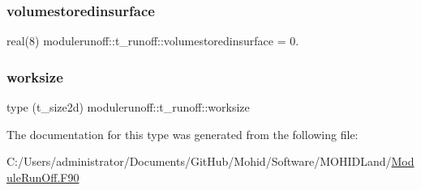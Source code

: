 \mbox{\label{structmodulerunoff_1_1t__runoff_adf99b757fd16db5037778285f91d6fb6}} 
\subsubsection{\texorpdfstring{volumestoredinsurface}{volumestoredinsurface}}
{\footnotesize\ttfamily real(8) modulerunoff\+::t\+\_\+runoff\+::volumestoredinsurface = 0.\hspace{0.3cm}{\ttfamily [private]}}

\mbox{\label{structmodulerunoff_1_1t__runoff_a661491d498286923ef73a051b5bab036}} 
\subsubsection{\texorpdfstring{worksize}{worksize}}
{\footnotesize\ttfamily type (t\+\_\+size2d) modulerunoff\+::t\+\_\+runoff\+::worksize\hspace{0.3cm}{\ttfamily [private]}}



The documentation for this type was generated from the following file\+:\begin{DoxyCompactItemize}
\item 
C\+:/\+Users/administrator/\+Documents/\+Git\+Hub/\+Mohid/\+Software/\+M\+O\+H\+I\+D\+Land/\mbox{\hyperlink{_module_run_off_8_f90}{Module\+Run\+Off.\+F90}}\end{DoxyCompactItemize}

